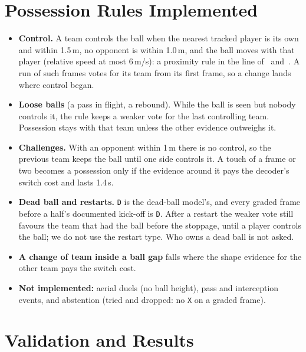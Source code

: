 \documentclass[conference,a4paper]{IEEEtran}
\newcommand{\code}[1]{\texttt{#1}}
\begin{document}
\section{Possession Rules Implemented}
\label{sec:rules}

\begin{itemize}
\item \textbf{Control.} A team controls the ball when the nearest tracked player is its own and within 1.5\,m, no
  opponent is within 1.0\,m, and the ball moves with that player (relative speed at most 6\,m/s): a proximity
  rule in the line of~\cite{link2017} and~\cite{vidal2022}. A run of such frames votes for its team from its
  first frame, so a change lands where control began.
\item \textbf{Loose balls} (a pass in flight, a rebound). While the ball is seen but nobody controls it, the rule
  keeps a weaker vote for the last controlling team. Possession stays with that team unless the other evidence
  outweighs it.
\item \textbf{Challenges.} With an opponent within 1\,m there is no control, so the previous team keeps the ball
  until one side controls it. A touch of a frame or two becomes a possession only if the evidence around it pays
  the decoder's switch cost and lasts 1.4\,s.
\item \textbf{Dead ball and restarts.} \code{D} is the dead-ball model's, and every graded frame before a half's
  documented kick-off is \code{D}. After a restart the weaker vote still favours the team that had the ball
  before the stoppage, until a player controls the ball; we do not use the restart type. Who owns a dead ball is
  not asked.
\item \textbf{A change of team inside a ball gap} falls where the shape evidence for the other team pays the
  switch cost.
\item \textbf{Not implemented:} aerial duels (no ball height), pass and interception events, and abstention (tried
  and dropped: no \code{X} on a graded frame).
\end{itemize}

\section{Validation and Results}
\label{sec:validation}
\end{document}
